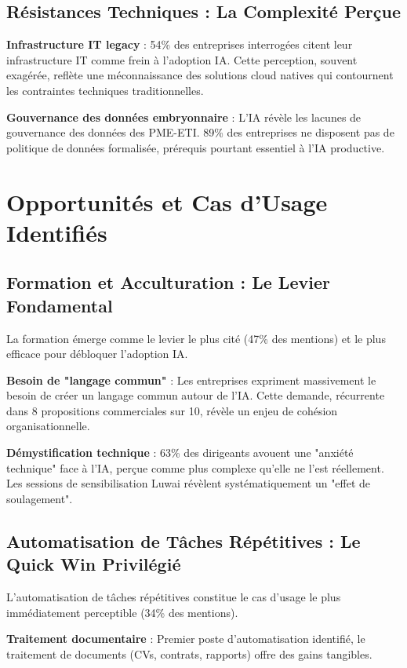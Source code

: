 \documentclass[12pt,a4paper]{report}
\begin{document}
\subsection{Résistances Techniques : La Complexité Perçue}

\textbf{Infrastructure IT legacy} : 54\% des entreprises interrogées citent leur infrastructure IT comme frein à l'adoption IA. Cette perception, souvent exagérée, reflète une méconnaissance des solutions cloud natives qui contournent les contraintes techniques traditionnelles.

\textbf{Gouvernance des données embryonnaire} : L'IA révèle les lacunes de gouvernance des données des PME-ETI. 89\% des entreprises ne disposent pas de politique de données formalisée, prérequis pourtant essentiel à l'IA productive.

\section{Opportunités et Cas d'Usage Identifiés}

\subsection{Formation et Acculturation : Le Levier Fondamental}

La formation émerge comme le levier le plus cité (47\% des mentions) et le plus efficace pour débloquer l'adoption IA.

\textbf{Besoin de "langage commun"} : Les entreprises expriment massivement le besoin de créer un langage commun autour de l'IA. Cette demande, récurrente dans 8 propositions commerciales sur 10, révèle un enjeu de cohésion organisationnelle.

\textbf{Démystification technique} : 63\% des dirigeants avouent une "anxiété technique" face à l'IA, perçue comme plus complexe qu'elle ne l'est réellement. Les sessions de sensibilisation Luwai révèlent systématiquement un "effet de soulagement".

\subsection{Automatisation de Tâches Répétitives : Le Quick Win Privilégié}

L'automatisation de tâches répétitives constitue le cas d'usage le plus immédiatement perceptible (34\% des mentions).

\textbf{Traitement documentaire} : Premier poste d'automatisation identifié, le traitement de documents (CVs, contrats, rapports) offre des gains tangibles.
\end{document}
